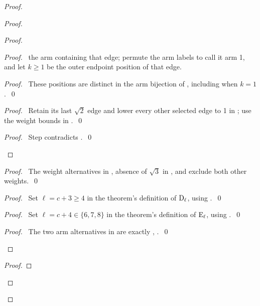 \begin{proof}
\begin{proof}
\begin{proof}
\begin{proof}
\pick\ the arm containing that edge; permute the arm labels to call it
arm 1, and let $k\geq1$ be the outer endpoint position of that edge.
\begin{proof}\pf\ These positions are distinct in the arm bijection
of , including when $k=1$.~\qed\end{proof}
\begin{proof}\pf\ Retain its last $\sqrt2$ edge and lower every other
selected edge to 1 in ; use the weight bounds in .~\qed\end{proof}
\qedstep
\begin{proof}\pf\ Step  contradicts .~\qed\end{proof}
\end{proof}
\begin{proof}\pf\ The weight alternatives in , absence of
$\sqrt3$ in , and  exclude both other weights.~\qed\end{proof}
\begin{proof}\pf\ Set $\ell=c+3\geq4$ in the theorem's definition of
$\mathrm{D}_\ell$, using .~\qed\end{proof}
\begin{proof}\pf\ Set $\ell=c+4\in\{6,7,8\}$ in the theorem's definition
of $\mathrm{E}_\ell$, using .~\qed\end{proof}
\qedstep
\begin{proof}\pf\ The two arm alternatives in 
are exactly , .~\qed\end{proof}
\end{proof}
\begin{proof}

\end{proof}
\end{proof}
\end{proof}

